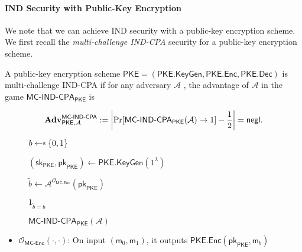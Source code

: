 \paragraph{IND Security with Public-Key Encryption}

We note that we can achieve IND security with a public-key encryption scheme. We first recall the \emph{multi-challenge IND-CPA} security for a public-key encryption scheme.

\begin{definition}

A public-key encryption scheme $\textsf{PKE} = (\textsf{PKE.KeyGen}, \textsf{PKE.Enc}, \textsf{PKE.Dec})$ is multi-challenge IND-CPA if for any adversary $\mathcal{A}$ , the advantage of $\mathcal{A}$ in the game $\textsf{MC-IND-CPA}_{\textsf{PKE}}$ is

\[
	\mathbf{Adv}^{\textsf{MC-IND-CPA}}_{\textsf{PKE}, \mathcal{A}} := \left| \Pr[ \textsf{MC-IND-CPA}_{\textsf{PKE}}(\mathcal{A}) \to 1 ] - \frac{1}{2} \right| = \mathsf{negl}.
\]

\begin{figure}[h]
\centering

	\begin{minipage}[t]{0.6\textwidth}
	\begin{algorithm}[H]
	\caption{$\textsf{MC-IND-CPA}_{\textsf{PKE}} (\mathcal{A})$ }
	\label{alg:MC-IND-CPA}
	\begin{algorithmic}[1]
		\State $b \getsdollar \{0, 1\}$

		\State $(\textsf{sk}_{\textsf{PKE}}, \textsf{pk}_{\textsf{PKE}}) \gets \textsf{PKE.KeyGen}(1^\lambda)$
		
		\State $\tilde{b} \gets \mathcal{A}^{\mathcal{O}_{\textsf{MC-Enc}}}(\textsf{pk}_{\textsf{PKE}})$ 
		
		\State \Return $1_{\tilde{b} = b}$
	\end{algorithmic}
	\end{algorithm}
	\end{minipage}

\end{figure}
\end{definition}

\begin{itemize}
	\item $\mathcal{O}_{\textsf{MC-Enc}}(\cdot, \cdot)$: On input $(\textsf{m}_0, \textsf{m}_1)$, it outputs $\textsf{PKE.Enc}(\textsf{pk}_{\textsf{PKE}}, \textsf{m}_b)$
\end{itemize}

